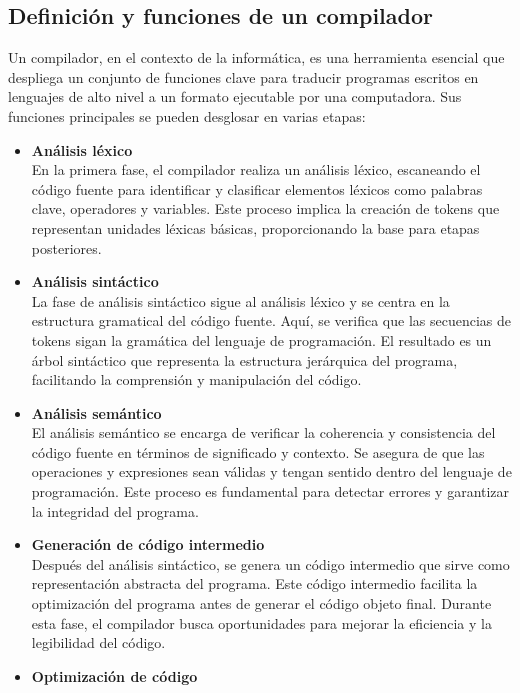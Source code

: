\subsection{Definición y funciones de un compilador}
Un compilador, en el contexto de la informática, es una herramienta esencial que despliega un conjunto de funciones clave para traducir programas escritos en lenguajes de alto nivel a un formato ejecutable por una computadora. Sus funciones principales se pueden desglosar en varias etapas:

\begin{itemize}
  \item \textbf{Análisis léxico} \\
  En la primera fase, el compilador realiza un análisis léxico, escaneando el código fuente para identificar y clasificar elementos léxicos como palabras clave, operadores y variables. Este proceso implica la creación de tokens que representan unidades léxicas básicas, proporcionando la base para etapas posteriores. \parencite{cooper2022}
  \item \textbf{Análisis sintáctico} \\
  La fase de análisis sintáctico sigue al análisis léxico y se centra en la estructura gramatical del código fuente. Aquí, se verifica que las secuencias de tokens sigan la gramática del lenguaje de programación. El resultado es un árbol sintáctico que representa la estructura jerárquica del programa, facilitando la comprensión y manipulación del código. \parencite{Anderson2010}
  \item \textbf{Análisis semántico} \\
  El análisis semántico se encarga de verificar la coherencia y consistencia del código fuente en términos de significado y contexto. Se asegura de que las operaciones y expresiones sean válidas y tengan sentido dentro del lenguaje de programación. Este proceso es fundamental para detectar errores y garantizar la integridad del programa. \parencite{Anderson2010}
  \item \textbf{Generación de código intermedio} \\
  Después del análisis sintáctico, se genera un código intermedio que sirve como representación abstracta del programa. Este código intermedio facilita la optimización del programa antes de generar el código objeto final. Durante esta fase, el compilador busca oportunidades para mejorar la eficiencia y la legibilidad del código. \parencite{cooper2022}
  \item \textbf{Optimización de código} \\

\end{itemize}
